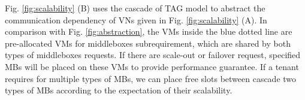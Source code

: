 \documentclass[review]{elsarticle}
\begin{document}
Fig. \ref{fig:scalability} (B) uses the cascade of TAG model to abstract the communication dependency of VNs given in Fig. \ref{fig:scalability} (A). In comparison with Fig. \ref{fig:abstraction}, the VMs inside the blue dotted line are pre-allocated VMs for middleboxes subrequirement, which are shared by both types of middleboxes requests. If there are scale-out or failover request, specified MBs will be placed on these VMs to provide performance guarantee. If a tenant requires for multiple types of MBs, we can place free slots between cascade two types of MBs according to the expectation of their scalability. 
\end{document}

